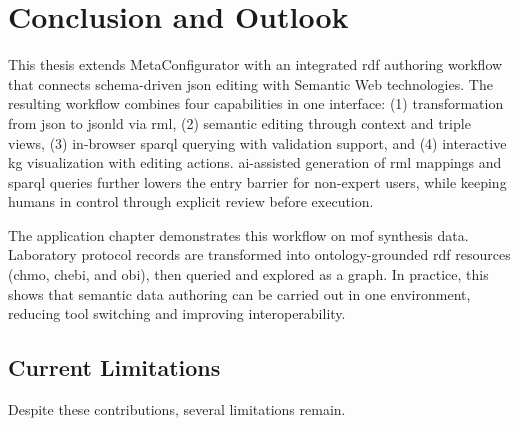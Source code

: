 \chapter{Conclusion and Outlook}\label{sec:conclusion}

This thesis extends MetaConfigurator with an integrated \gls{rdf} authoring workflow that connects schema-driven \gls{json} editing with Semantic Web technologies. The resulting workflow combines four capabilities in one interface: (1) transformation from \gls{json} to \gls{jsonld} via \gls{rml}, (2) semantic editing through context and triple views, (3) in-browser \gls{sparql} querying with validation support, and (4) interactive \gls{kg} visualization with editing actions. \gls{ai}-assisted generation of \gls{rml} mappings and \gls{sparql} queries further lowers the entry barrier for non-expert users, while keeping humans in control through explicit review before execution.

The application chapter demonstrates this workflow on \gls{mof} synthesis data. Laboratory protocol records are transformed into ontology-grounded \gls{rdf} resources (\gls{chmo}, \gls{chebi}, and \gls{obi}), then queried and explored as a graph. In practice, this shows that semantic data authoring can be carried out in one environment, reducing tool switching and improving interoperability.

\section{Current Limitations}

Despite these contributions, several limitations remain.

